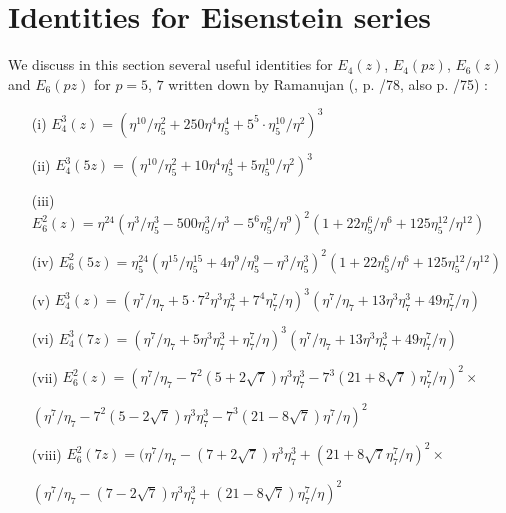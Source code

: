 \section{Identities for Eisenstein series}\label{art8-sec4}
We discuss in this section several useful identities for $E_{4}(z)$, $E_{4}(pz)$, $E_{6}(z)$ and $E_{6}(pz)$ for $p=5$, $7$ written down by Ramanujan (\cite{art8-key11}, p. /78, also p. /75) :
\begin{itemize}
\item[(i)] $E^{3}_{4}(z)=(\eta^{10}/\eta^{2}_{5}+250\eta^{4}\eta^{4}_{5}+5^{5}\cdot \eta^{10}_{5}/\eta^{2})^{3}$

\item[(ii)] $E^{3}_{4}(5z)=(\eta^{10}/\eta^{2}_{5}+10\eta^{4}\eta^{4}_{5}+5\eta^{10}_{5}/\eta^{2})^{3}$

\item[(iii)] $E^{2}_{6}(z)=\eta^{24}(\eta^{3}/\eta^{3}_{5}-500\eta^{3}_{5}/\eta^{3}-5^{6}\eta^{9}_{5}/\eta^{9})^{2}(1+22\eta^{6}_{5}/\eta^{6}+125\eta^{12}_{5}/\eta^{12})$

\item[(iv)] $E^{2}_{6}(5z)=\eta^{24}_{5}(\eta^{15}/\eta^{15}_{5}+4\eta^{9}/\eta^{9}_{5}-\eta^{3}/\eta^{3}_{5})^{2}(1+22\eta^{6}_{5}/\eta^{6}+125\eta^{12}_{5}/\eta^{12})$

\item[(v)]\pageoriginale $E^{3}_{4}(z)=(\eta^{7}/\eta_{7}+5\cdot 7^{2}\eta^{3}\eta^{3}_{7}+7^{4}\eta^{7}_{7}/\eta)^{3}(\eta^{7}/\eta_{7}+13\eta^{3}\eta^{3}_{7}+49\eta^{7}_{7}/\eta)$

\item[(vi)] $E^{3}_{4}(7z)=(\eta^{7}/\eta_{7}+5\eta^{3}\eta^{3}_{7}+\eta^{7}_{7}/\eta)^{3}(\eta^{7}/\eta_{7}+13\eta^{3}\eta^{3}_{7}+49\eta^{7}_{7}/\eta)$

\item[(vii)] $E^{2}_{6}(z)=(\eta^{7}/\eta_{7}-7^{2}(5+2\sqrt{7})\eta^{3}\eta^{3}_{7}-7^{3}(21+8\sqrt{7})\eta^{7}_{7}/\eta)^{2}\times$

\qquad\qquad $(\eta^{7}/\eta_{7}-7^{2}(5-2\sqrt{7})\eta^{3}\eta^{3}_{7}-7^{3}(21-8\sqrt{7})\eta^{7}/\eta)^{2}$

\item[(viii)] $E^{2}_{6}(7z)=(\eta^{7}/\eta_{7}-(7+2\sqrt{7})\eta^{3}\eta^{3}_{7}+(21+8\sqrt{7}\eta^{7}_{7}/\eta)^{2}\times$

\qquad\qquad $(\eta^{7}/\eta_{7}-(7-2\sqrt{7})\eta^{3}\eta^{3}_{7}+(21-8\sqrt{7})\eta^{7}_{7}/\eta)^{2}$
\end{itemize}

